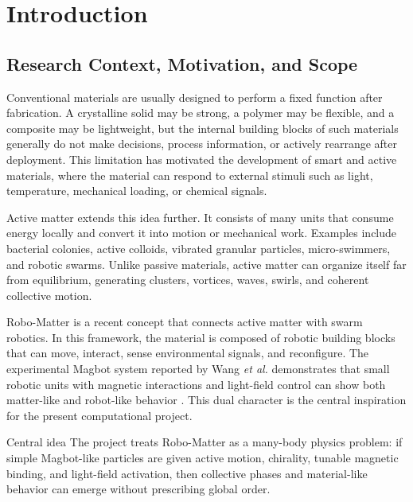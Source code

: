 \documentclass[12pt,a4paper,oneside]{report}
\begin{document}
\chapter{Introduction}

\section{Research Context, Motivation, and Scope}
Conventional materials are usually designed to perform a fixed function after fabrication. A crystalline solid may be strong, a polymer may be flexible, and a composite may be lightweight, but the internal building blocks of such materials generally do not make decisions, process information, or actively rearrange after deployment. This limitation has motivated the development of smart and active materials, where the material can respond to external stimuli such as light, temperature, mechanical loading, or chemical signals.

Active matter extends this idea further. It consists of many units that consume energy locally and convert it into motion or mechanical work. Examples include bacterial colonies, active colloids, vibrated granular particles, micro-swimmers, and robotic swarms. Unlike passive materials, active matter can organize itself far from equilibrium, generating clusters, vortices, waves, swirls, and coherent collective motion.

Robo-Matter is a recent concept that connects active matter with swarm robotics. In this framework, the material is composed of robotic building blocks that can move, interact, sense environmental signals, and reconfigure. The experimental Magbot system reported by Wang \textit{et al.} demonstrates that small robotic units with magnetic interactions and light-field control can show both matter-like and robot-like behavior \cite{wang2024robomatter}. This dual character is the central inspiration for the present computational project.

\begin{keybox}{Central idea}
The project treats Robo-Matter as a many-body physics problem: if simple Magbot-like particles are given active motion, chirality, tunable magnetic binding, and light-field activation, then collective phases and material-like behavior can emerge without prescribing global order.
\end{keybox}
\end{document}
